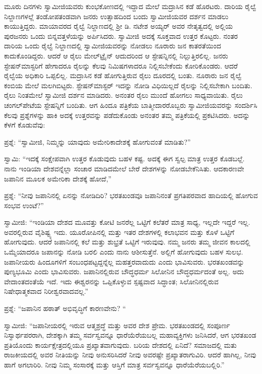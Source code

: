  ಮೂರು ದಿನಗಳು ಸ್ವಾಮೀಜಿಯವರು ಕುಂಭಕೋಣದಲ್ಲಿ ಇದ್ದಾದ ಮೇಲೆ ಮದ್ರಾಸಿನ ಕಡೆ ಹೊರಟರು. ದಾರಿಯ ರೈಲ್ವೆ ನಿಲ್ದಾಣಗಳಲ್ಲೆ ತಂಡೋಪತಂಡವಾಗಿ ಜನರು ಉತ್ಸಾಹದಿಂದ ಬಂದು ಸ್ವಾಮೀಜಿಯವರ ದರ್ಶನ ಮಾಡಲು ಕಾಯುತ್ತಿದ್ದರು. ಮಾಯಾವರದ ರೈಲ್ವೆ ನಿಲ್ದಾಣದಲ್ಲಿ ಶ‍್ರೀ ಡಿ. ನಟೇಶ ಅಯ್ಯರ್ ಅವರ ನೇತೃತ್ವದಲ್ಲಿ ಅಲ್ಲಿಯ ಪುರಜನರು ಒಂದು ಬಿನ್ನವತ್ತಳೆಯನ್ನು ಅರ್ಪಿಸಿದರು. ಸ್ವಾಮೀಜಿ ಅದಕ್ಕೆ ಸೂಕ್ತವಾದ ಉತ್ತರ ಕೊಟ್ಟರು. ನಂತರ ದಾರಿಯ ಒಂದು ರೈಲ್ವೆ ನಿಲ್ದಾಣದಲ್ಲಿ ಸ್ವಾಮೀಜಿಯವರನ್ನು ನೋಡಲು ನೂರಾರು ಜನ ಕಾತರತೆಯಿಂದ ಕಾದುಕೊಂಡಿದ್ದರು. ಆದರೆ ಆ ರೈಲು ಮೇಲ್‌ಟ್ರೈನ್ ಆದುದರಿಂದ ಆ ಸ್ಟೇಷನ್ನಿನಲ್ಲಿ ನಿಲ್ಲುತ್ತಿರಲಿಲ್ಲ. ಜನರು ಸ್ಟೇಷನ್‌ಮಾಸ್ಟರಿಗೆ ಹೇಗಾದರೂ ರೈಲನ್ನು ಕೆಲವು ನಿಮಿಷಗಳಾದರೂ ನಿಲ್ಲಿಸಬೇಕೆಂದು ಕೋರಿಕೊಂಡರು. ಆದರೆ ರೈಲ್ವೆಯ ಅಧಿಕಾರಿ ಒಪ್ಪಲಿಲ್ಲ. ಮದ್ರಾಸಿನ ಕಡೆ ಹೋಗುತ್ತಿರುವ ರೈಲು ದೂರದಲ್ಲಿ ಬಂತು. ನೂರಾರು ಜನ ರೈಲ್ವೆ ಕಂಬಿಯ ಮೇಲೆ ಮಲಗಿಬಿಟ್ಟರು. ಸ್ಟೇಷನ್‌ಮಾಸ್ಟರ್ ಇದನ್ನು ನೋಡಿ ವಿಧಿಯಿಲ್ಲದೆ ರೈಲನ್ನು ನಿಲ್ಲಿಸಬೇಕಾಗಿ ಬಂದಿತು. ರೈಲು ನಿಂತಮೇಲೆ ಸ್ವಾಮೀಜಿ ದರ್ಶನ ಮಾಡಿದರು. ಅನಂತರ ರೈಲು ಮುಂದೆ ಹೋಗಲು ಸಾಧ್ಯವಾಯಿತು. ರೈಲು ಚಂಗಲ್‌ಪೇಟೆಯ ಸ್ಟೇಷನ್ನಿಗೆ ಬಂದಿತು. ಆಗ ಹಿಂದೂ ಪತ್ರಿಕೆಯ ಬಾತ್ಮೀದಾರರೊಬ್ಬರು ಸ್ವಾಮೀಜಿಯವರನ್ನು ಸಂದರ್ಶಿಸಿ ಕೆಲವು ಪ್ರಶ್ನೆಗಳನ್ನು ಹಾಕಿ ಅದಕ್ಕೆ ಉತ್ತರವನ್ನು ಪಡೆದುಕೊಂಡು ಅನಂತರ ತಮ್ಮ ಪತ್ರಿಕೆಯಲ್ಲಿ ಪ್ರಕಟಿಸಿದರು. ಅದನ್ನು ಕೆಳಗೆ ಕೊಡುವೆವು: 

 ಪ್ರಶ್ನೆ: “ಸ್ವಾಮೀಜಿ, ನಿಮ್ಮನ್ನು ಯಾವುದು ಅಮೇರಿಕಾದೇಶಕ್ಕೆ ಹೋಗುವಂತೆ ಮಾಡಿತು?” 

 ಸ್ವಾಮಿ: “ಇದಕ್ಕೆ ಸಂಕ್ಷೇಪವಾಗಿ ಉತ್ತರ ಕೊಡುವುದು ಬಹಳ ಕಷ್ಟ. ಅದಕ್ಕೆ ಈಗ ಸ್ವಲ್ಪ ಮಾತ್ರ ಉತ್ತರ ಕೊಡಬಲ್ಲೆ. ನಾನು ಇಂಡಿಯಾ ದೇಶವನ್ನೆಲ್ಲಾ ಸಂಚಾರ ಮಾಡಿದಮೇಲೆ ಬೇರೆ ದೇಶಗಳನ್ನು ನೋಡಬೇಕೆನಿಸಿತು. ಆದಕಾರಣವೇ ಜಪಾನಿನ ಮೂಲಕ ಅಮೇರಿಕಾ ದೇಶಕ್ಕೆ ಹೋದೆ,” 

 ಪ್ರಶ್ನೆ: “ನೀವು ಜಪಾನಿನಲ್ಲಿ ಏನನ್ನು ನೋಡಿದಿರಿ? ಭರತಖಂಡವೂ ಜಪಾನಿನಂತೆ ಪ್ರಗತಿಪರವಾದ ಹಾದಿಯಲ್ಲಿ ಹೋಗುವ ಸಂಭವ ಉಂಟೆ?” 

 ಸ್ವಾಮೀಜಿ: “ಇಂಡಿಯಾ ದೇಶದ ಮೂವತ್ತು ಕೋಟಿ ಜನರೆಲ್ಲ ಒಟ್ಟಿಗೆ ಕಲೆತರೆ ಮಾತ್ರ ಸಾಧ್ಯ, ಇಲ್ಲದೇ ಇದ್ದರೆ ಇಲ್ಲ. ಅವರಲ್ಲಿರುವ ವೈಶಿಷ್ಟ್ಯ ಇದು. ಯೂರೋಪಿನಲ್ಲಿ ಮತ್ತು ಇತರ ದೇಶಗಳಲ್ಲಿ ಕಲಾಭವನ ಮತ್ತು ಕೊಳೆ ಒಟ್ಟಿಗೆ ಹೋಗುವುದು. ಆದರೆ ಜಪಾನಿನಲ್ಲಿ ಕಲೆ ಮತ್ತು ಶುಭ್ರತೆ ಒಟ್ಟಿಗೆ ಇರುವುವು. ನಮ್ಮ ಜನರು ತಮ್ಮ ಜೀವನ ಕಾಲದಲ್ಲಿ ಒಮ್ಮೆಯಾದರೂ ಜಪಾನನ್ನು ನೋಡಿ ಬರಲಿ ಎಂದು ನಾನು ಆಶೀಸುತ್ತೆನೆ. ಅಲ್ಲಿಗೆ ಹೋಗುವುದು ಬಹಳ ಸುಲಭ. ಜಪಾನೀಯರು ಹಿಂದೂಗಳಿಗೆ ಸಂಬಂಧಪಟ್ಟದ್ದನ್ನೆಲ್ಲ ಮಹತ್ತರವಾದುದು ಎಂದು ಭಾವಿಸುವರು. ಭರತಖಂಡವನ್ನು ಪುಣ್ಯಭೂಮಿ ಎಂದು ಭಾವಿಸುವರು. ಜಪಾನಿನಲ್ಲಿರುವ ಬೌದ್ಧಧರ್ಮ ಸಿಲೋನಿನ ಬೌದ್ಧಧರ್ಮದಂತೆ ಅಲ್ಲ. ಅದು ವೇದಾಂತದಂತೆಯೆ ಇದೆ. ಇದು ಈಶ್ವರನನ್ನು ಒಪ್ಪಿಕೊಳ್ಳುವ ಸ್ಪಷ್ಟವಾದ ಸಿದ್ಧಾಂತ; ಸಿಲೋನಿನಲ್ಲಿರುವ ನಿಷೇಧಾತ್ಮಕವಾದ ನಿರೀಶ್ವರವಾದವಲ್ಲ.” 

 ಪ್ರಶ್ನೆ: “ಜಪಾನಿನ ಹಠಾತ್ ಅಭಿವೃದ್ಧಿಗೆ ಕಾರಣವೇನು? “ 

 ಸ್ವಾಮೀಜಿ: “ಜಪಾನೀಯರಲ್ಲಿ ಇರುವ ಆತ್ಮಶ್ರದ್ಧೆ ಮತ್ತು ಅವರ ದೇಶ ಪ್ರೇಮ. ಭರತಖಂಡದಲ್ಲಿ ಸಂಪೂರ್ಣ ನಿಸ್ವಾರ್ಥಪರರಾಗಿ, ದೇಶಕ್ಕಾಗಿ ತಮ್ಮ ಸರ್ವಸ್ವವನ್ನೂ ಧಾರೆಯೆರೆಯಬಲ್ಲ ಮಹಾವ್ಯಕ್ತಿಗಳು ಜನಿಸಿದರೆ, ಆಗ ಭರತಖಂಡ ಪ್ರತಿಯೊಂದು ಕಾರ್ಯಕ್ಷೇತ್ರದಲ್ಲಿಯೂ ಪ್ರಖ್ಯಾತವಾಗುವುದು. ಬರಿಯ ದೇಶದಲ್ಲಿ ಏನಿದೆ? ಸಮಾಜದಲ್ಲಿ ಮತು ರಾಜಕೀಯದಲ್ಲಿ ಅವರ ನೀತಿಯನ್ನು ನೀವು ಅನುಸರಿಸಿದರೆ ನೀವು ಅವರಷ್ಟೇ ಪ್ರಖ್ಯಾತರಾಗುವಿರಿ. ಆದರೆ ಹಾಗಿಲ್ಲ, ನೀವು ಹಾಗೆ ಅಗಲಾರಿರಿ. ನೀವು ನಿಮ್ಮ ಸಂಸಾರಕ್ಕೆ ಮತ್ತು ಆಸ್ತಿಗೆ ಮಾತ್ರ ಸರ್ವಸ್ವವನ್ನೂ ಧಾರೆಯೆರೆಯಬಲ್ಲಿರಿ.” 

